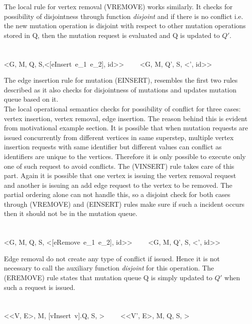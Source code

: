 \smallskip

The local rule for vertex removal (VREMOVE) works similarly. It checks for possibility of disjointness through function \emph{disjoint} and if there is no conflict i.e. the new mutation operation is disjoint with respect to other mutation operations stored in Q, then the mutation request is evaluated and Q is updated to $Q'$.\\
\ \\
\ \\
{<G, M, Q, S,\Sigma <[eInsert\ e_1~e_2], id>> \ \ \reducesto \ \ <G, M, Q', S, \Sigma <', id>>}

\smallskip

The edge insertion rule for mutation (EINSERT), resembles the first two rules described as it also checks for disjointness of mutations and updates mutation queue based on it.\\
The local operational semantics checks for possibility of conflict for three cases: vertex insertion, vertex removal, edge insertion. The reason behind this is evident from motivational example section. It is possible that when mutation requests are issued concurrently from different vertices in same superstep, multiple vertex insertion requests with same identifier but different values can conflict as identifiers are unique to the vertices. Therefore it is only possible to execute only one of such request to avoid conflicts. The (VINSERT) rule takes care of this part. Again it is possible that one vertex is issuing the vertex removal request and another is issuing an add edge request to the vertex to be removed. The partial ordering alone can not handle this, so a disjoint check for both cases through (VREMOVE) and (EINSERT) rules make sure if such a incident occurs then it should not be in the mutation queue.\\
\ \\ 
\ \\
{<G, M, Q, S, \Sigma <[eRemove\ e_1~e_2], id>> \ \ \reducesto \ \ <G, M, Q', S, \Sigma <', id>>}

\smallskip

Edge removal do not create any type of conflict if issued. Hence it is not necessary to call the auxiliary function \emph{disjoint} for this operation. The (EREMOVE) rule states that mutation queue Q is simply updated to $Q'$ when such a request is issued.\\
\ \\
\ \\
{<<V, E>, M, [vInsert\ v].Q, S, \bullet > \ \ \reducesto \ \ <<V', E>, M, Q, S, \bullet >}

